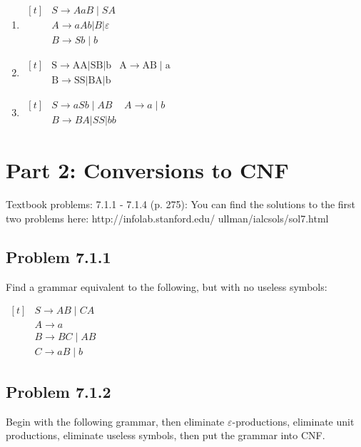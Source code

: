 \documentclass[12pt]{scrbook}
\begin{document}
\begin{enumerate}
  \item $
    \begin{aligned}[t]
        & S \rightarrow A a B \mid S A \\
        & A \rightarrow a A b|B| \varepsilon \\
        & B \rightarrow S b \mid b
    \end{aligned}
     $
   \item $
     \begin{aligned}[t]
       & \mathrm{S} \rightarrow \mathrm{AA}|\mathrm{SB}| \mathrm{b}
       & \mathrm{A} \rightarrow \mathrm{AB} \mid \mathrm{a} \\
       & \mathrm{B} \rightarrow \mathrm{SS}|\mathrm{BA}| \mathrm{b}
     \end{aligned}
     $
   \item $
     \begin{aligned}[t]
        & S \rightarrow a S b \mid A B
        & A \rightarrow a \mid b \\
        & B \rightarrow B A|S S| b b
     \end{aligned}
     $
\end{enumerate}

\newpage

\section*{Part 2: Conversions to CNF}
Textbook problems: 7.1.1 - 7.1.4 (p. 275): You can find the solutions to the first two problems here: http://infolab.stanford.edu/ ullman/ialcsols/sol7.html


\subsection*{Problem 7.1.1}Find a grammar equivalent to the following, but with no useless symbols:

$ \begin{aligned}[t]
& S \rightarrow A B \mid C A \\
& A \rightarrow a \\
& B \rightarrow B C \mid A B \\
& C \rightarrow a B \mid b
\end{aligned} $

\newpage
\subsection*{Problem 7.1.2}Begin with the following grammar, then eliminate $\varepsilon$-productions, eliminate unit productions, eliminate useless symbols, then put the grammar into CNF.
\end{document}
